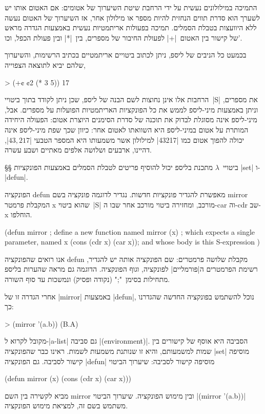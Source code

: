 התמיכה במילולונים נעשית על ידי הרחבת שיטת השיערוך של אטומים: אם האטום אותו יש
לשערך הוא סדרת תווים הנחזית להיות מספר או מילולון אחר, אז השיערוך של האטום נעשה
ללא היוועצות בטבלת הסמלים. תמיכה בפעולות אריתמטיות נעשית באמצעות הגדרה מראש של
קישור בין האטום~\T|+| לפעולת החיבור של מספרים, בין~\T|*| ובין פעולת הכפל,
וכו'.

בכמעט כל הניבים של ליספ, ניתן לכתוב ביטויים אריתמטיים בכתיב הרשימות, והשיערוך
שלהם יביא לתוצאה הצפוייה,

\begin{LISP}
> (+¢ ¢2 (* 3 5))
17
\end{LISP}

הרחבות אלו אינן נחוצות לשם הבנה של ליספ, שכן ניתן לקודד בתוך ביטויי~\E|S| את
מספרים, וניתן באמצעות מיני-ליספ לממש את כל הפונקציות האריתמטיות הפועלות על
מספרים. אבל, מיני-ליספ אינה מסוגלת לבדוק את תוכנה של סדרת הסימנים היוצרת אטום:
הפעולה היחידה המותרת על אטום במיני-ליספ היא השוואתו לאטום אחר: כיוון שכך שפת
מיני-ליספ אינה יכולה להפוך אטום כמו \T|43217| למילולון אשר משמעותו היא המספר
הטבעי \E|$43,217$|, דהיינו, ארבעים ושלושה אלפים מאתיים ושבע עשרה.

§§ ביטויי~$λ$
מתכנת בליספ יכול להוסיף פריטים לטבלת הסמלים באמצעות הפונקציות \E|set|
ו-\E|defun|.

הפונקציה defun מאפשרת להגדיר פונקציות חדשות. נגדיר לדוגמה פונקציה בשם mirror
המקבלת פרמטר x שהוא ביטוי~\E|S| מורכב, ומחזירה ביטוי מורכב אחר שבו ה-car וה-cdr
שב-x הוחלפו.
\begin{LISP}
(defun mirror ; define a new function named mirror
  (x) ; which expects a single parameter, named x
  (cons (cdr x) (car x)); and whose body is this S-expression
)
\end{LISP}
אנו רואים שהפונקציה defun מקבלת שלושה פרמטרים: שם הפונקציה אותה יש להגדיר,
רשימת הפרמטרים ה\ע|פורמליים| לפונקציה, וגוף הפונקציה. הדוגמה גם מראה שהערות
בליספ מתחילות בסימן~";" (נקודה ופסיק) ונמשכות עד סוף השורה.

אחרי הגדרה זו של \E|mirror| באמצעות \E|defun|, נוכל להשתמש בפונקציה החדשה
שהגדרנו כך:
\begin{LISP}
> (mirror '(a.b))
(B.A)
\end{LISP}

מקובל לקרוא ל-\E|a-list| גם סביבה \E|(environment)|. הסביבה היא אוסף של קישורים
בין שמות למשמעותם, והיא זו שנותנת משמעות לשמות. ראינו כבר שהפונקציה \E|set|
מוסיפה קישור לסביבה. גם הפונקציה \E|defun| מוסיפה קישור לסביבה: שיערוך הביטוי
\begin{LISP}
(defun mirror (x) (cons (cdr x) (car x)))
\end{LISP}
מביא לקשירה בין השם mirror ובין מימוש הפונקציה. שיערוך הביטוי \T|(mirror
'(a.b))| משתמש בשם זה, למציאת מימוש הפונקציה.

